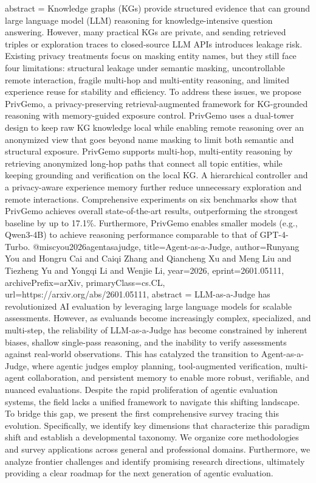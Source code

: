 {      abstract = {Knowledge graphs (KGs) provide structured evidence that can ground large language model (LLM) reasoning for knowledge-intensive question answering. However, many practical KGs are private, and sending retrieved triples or exploration traces to closed-source LLM APIs introduces leakage risk. Existing privacy treatments focus on masking entity names, but they still face four limitations: structural leakage under semantic masking, uncontrollable remote interaction, fragile multi-hop and multi-entity reasoning, and limited experience reuse for stability and efficiency. To address these issues, we propose PrivGemo, a privacy-preserving retrieval-augmented framework for KG-grounded reasoning with memory-guided exposure control. PrivGemo uses a dual-tower design to keep raw KG knowledge local while enabling remote reasoning over an anonymized view that goes beyond name masking to limit both semantic and structural exposure. PrivGemo supports multi-hop, multi-entity reasoning by retrieving anonymized long-hop paths that connect all topic entities, while keeping grounding and verification on the local KG. A hierarchical controller and a privacy-aware experience memory further reduce unnecessary exploration and remote interactions. Comprehensive experiments on six benchmarks show that PrivGemo achieves overall state-of-the-art results, outperforming the strongest baseline by up to 17.1\%. Furthermore, PrivGemo enables smaller models (e.g., Qwen3-4B) to achieve reasoning performance comparable to that of GPT-4-Turbo.}
}@misc{you2026agentasajudge,
      title={Agent-as-a-Judge}, 
      author={Runyang You and Hongru Cai and Caiqi Zhang and Qiancheng Xu and Meng Liu and Tiezheng Yu and Yongqi Li and Wenjie Li},
      year={2026},
      eprint={2601.05111},
      archivePrefix={arXiv},
      primaryClass={cs.CL},
      url={https://arxiv.org/abs/2601.05111},
      abstract = {LLM-as-a-Judge has revolutionized AI evaluation by leveraging large language models for scalable assessments. However, as evaluands become increasingly complex, specialized, and multi-step, the reliability of LLM-as-a-Judge has become constrained by inherent biases, shallow single-pass reasoning, and the inability to verify assessments against real-world observations. This has catalyzed the transition to Agent-as-a-Judge, where agentic judges employ planning, tool-augmented verification, multi-agent collaboration, and persistent memory to enable more robust, verifiable, and nuanced evaluations. Despite the rapid proliferation of agentic evaluation systems, the field lacks a unified framework to navigate this shifting landscape. To bridge this gap, we present the first comprehensive survey tracing this evolution. Specifically, we identify key dimensions that characterize this paradigm shift and establish a developmental taxonomy. We organize core methodologies and survey applications across general and professional domains. Furthermore, we analyze frontier challenges and identify promising research directions, ultimately providing a clear roadmap for the next generation of agentic evaluation.}
}
